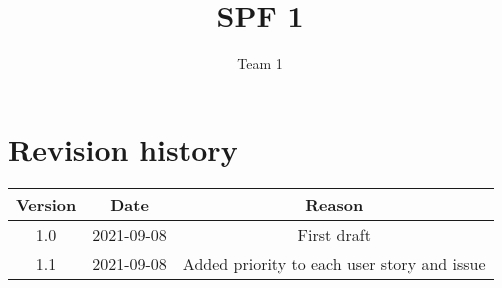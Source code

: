 \documentclass{article}
\title{SPF 1}
\author{Team 1}
\begin{document}
\date{}
\maketitle
\thispagestyle{fancy}

\section*{Revision history}
\begin{tabular}{ |c|c|c| } 
 \hline
 Version & Date & Reason \\ \hline
 1.0 & 2021-09-08 & First draft \\ 
 1.1 & 2021-09-08 & Added priority to each user story and issue \\ 
 \hline
\end{tabular}

\newpage
\end{document}
